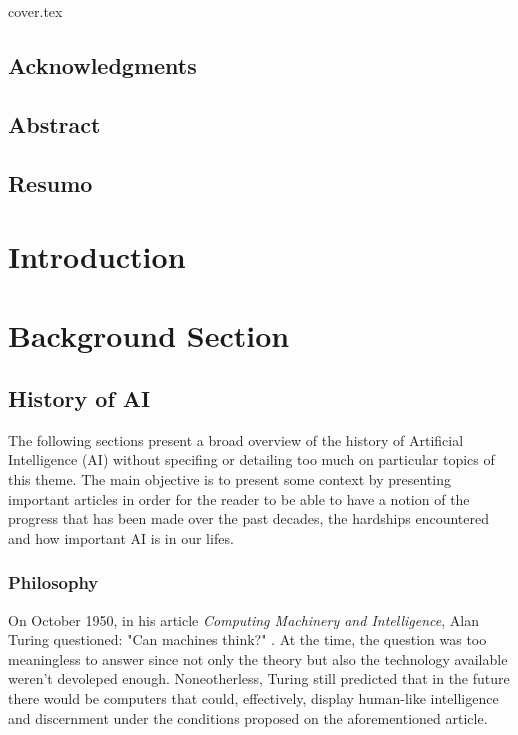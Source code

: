 \documentclass[a4paper, 12pt]{report}
\makeatletter
\newcommand\frontmatter{%
    \cleardoublepage
  \pagenumbering{roman}}
\newcommand\mainmatter{%
    \cleardoublepage
  \pagenumbering{arabic}}
\makeatother
\begin{document}
{cover.tex}

\tableofcontents
\frontmatter
\section*{Acknowledgments}
\newpage
\section*{Abstract}
\newpage
\section*{Resumo}

\mainmatter


\newpage

\chapter{Introduction}

\newpage
\chapter{Background Section}
\section{History of AI}
The following sections present a broad overview of the history of Artificial Intelligence (AI) without specifing or detailing too much on particular topics of this theme. The main objective is to present some context by presenting important articles in order for the reader to be able to have a notion of the progress that has been made over the past decades, the hardships encountered and how important AI is in our lifes. 
\subsection{Philosophy}
On October 1950, in his article \textit{Computing Machinery and Intelligence}, Alan Turing questioned: "Can machines think?" \autocite{turingCOMPUTINGMACHINERYINTELLIGENCE1950}. At the time, the question was too meaningless to answer since not only the theory but also the technology available weren't devoleped enough. Noneotherless, Turing still predicted that in the future there would be computers that could, effectively, display human-like intelligence and discernment under the conditions proposed on the aforementioned article.
\end{document}
